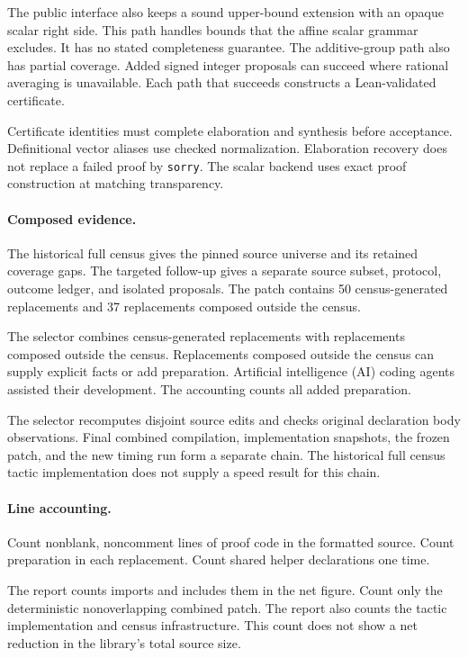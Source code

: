 The public interface also keeps a sound upper-bound extension with an opaque scalar right side.
This path handles bounds that the affine scalar grammar excludes.
It has no stated completeness guarantee.
The additive-group path also has partial coverage.
Added signed integer proposals can succeed where rational averaging is unavailable.
Each path that succeeds constructs a Lean-validated certificate.

Certificate identities must complete elaboration and synthesis before acceptance.
Definitional vector aliases use checked normalization.
Elaboration recovery does not replace a failed proof by \texttt{sorry}.
The scalar backend uses exact proof construction at matching transparency.

\paragraph{Composed evidence.}
The historical full census gives the pinned source universe and its retained coverage gaps.
The targeted follow-up gives a separate source subset, protocol, outcome ledger, and isolated proposals.
The patch contains 50 census-generated replacements and 37 replacements composed outside the census.

The selector combines census-generated replacements with replacements composed outside the census.
Replacements composed outside the census can supply explicit facts or add preparation.
Artificial intelligence (AI) coding agents assisted their development.
The accounting counts all added preparation.

The selector recomputes disjoint source edits and checks original declaration body observations.
Final combined compilation, implementation snapshots, the frozen patch, and the new timing run form a separate chain.
The historical full census tactic implementation does not supply a speed result for this chain.

\paragraph{Line accounting.}
Count nonblank, noncomment lines of proof code in the formatted source.
Count preparation in each replacement.
Count shared helper declarations one time.

The report counts imports and includes them in the net figure.
Count only the deterministic nonoverlapping combined patch.
The report also counts the tactic implementation and census infrastructure.
This count does not show a net reduction in the library's total source size.

